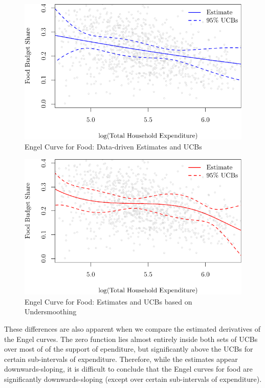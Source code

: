 \documentclass[
]{jss}
\begin{document}
\begin{figure}
\centering
\includegraphics{npiv_files/figure-latex/food-dd-1.pdf}
\caption{Engel Curve for Food: Data-driven Estimates and UCBs}
\end{figure}

\begin{figure}
\centering
\includegraphics{npiv_files/figure-latex/food-det-1.pdf}
\caption{Engel Curve for Food: Estimates and UCBs based on
Undersmoothing}
\end{figure}

These differences are also apparent when we compare the estimated
derivatives of the Engel curves. The zero function lies almost entirely
inside both sets of UCBs over most of of the support of ependiture, but
significantly above the UCBs for certain sub-intervals of expenditure.
Therefore, while the estimates appear downwards-sloping, it is difficult
to conclude that the Engel curves for food are significantly
downwards-sloping (except over certain sub-intervals of expenditure).
\end{document}
